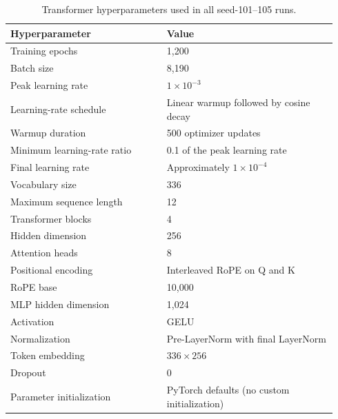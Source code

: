 \begin{table}[htbp]
  \centering
  \caption{Transformer hyperparameters used in all seed-101--105 runs.}
  \label{tab:transformer-hyperparameters}
  \small
  \begin{tabular}{@{}p{0.45\linewidth}p{0.49\linewidth}@{}}
    \toprule
    Hyperparameter & Value \\
    \midrule
    Training epochs & 1,200 \\
    Batch size & 8,190 \\
    Peak learning rate & $1\times10^{-3}$ \\
    Learning-rate schedule & Linear warmup followed by cosine decay \\
    Warmup duration & 500 optimizer updates \\
    Minimum learning-rate ratio & 0.1 of the peak learning rate \\
    Final learning rate & Approximately $1\times10^{-4}$ \\
    Vocabulary size & 336 \\
    Maximum sequence length & 12 \\
    Transformer blocks & 4 \\
    Hidden dimension & 256 \\
    Attention heads & 8 \\
    Positional encoding & Interleaved RoPE on Q and K \\
    RoPE base & 10,000 \\
    MLP hidden dimension & 1,024 \\
    Activation & GELU \\
    Normalization & Pre-LayerNorm with final LayerNorm \\
    Token embedding & $336\times256$ \\
    Dropout & 0 \\
    Parameter initialization & PyTorch defaults (no custom initialization) \\
    \bottomrule
  \end{tabular}
\end{table}
